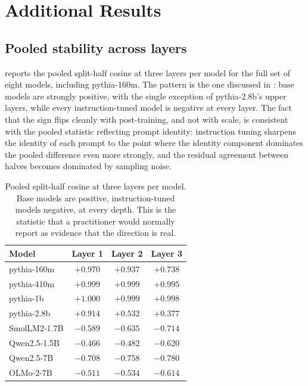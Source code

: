 \section{Additional Results}

\subsection{Pooled stability across layers}

 reports the pooled split-half cosine at three layers per model for the full
set of eight models, including pythia-160m. The pattern is the one discussed in
: base models are strongly positive, with the single exception of pythia-2.8b's
upper layers, while every instruction-tuned model is negative at every layer. The fact that the
sign flips cleanly with post-training, and not with scale, is consistent with the pooled statistic
reflecting prompt identity: instruction tuning sharpens the identity of each prompt to the point
where the identity component dominates the pooled difference even more strongly, and the residual
agreement between halves becomes dominated by sampling noise.

\begin{table}[t]
\centering
\small
\begin{tabular}{lccc}
\toprule
Model & Layer 1 & Layer 2 & Layer 3 \\
\midrule
pythia-160m          & $+0.970$ & $+0.937$ & $+0.738$ \\
pythia-410m          & $+0.999$ & $+0.999$ & $+0.995$ \\
pythia-1b            & $+1.000$ & $+0.999$ & $+0.998$ \\
pythia-2.8b          & $+0.914$ & $+0.532$ & $+0.377$ \\
SmolLM2-1.7B         & $-0.589$ & $-0.635$ & $-0.714$ \\
Qwen2.5-1.5B         & $-0.466$ & $-0.482$ & $-0.620$ \\
Qwen2.5-7B           & $-0.708$ & $-0.758$ & $-0.780$ \\
OLMo-2-7B            & $-0.511$ & $-0.534$ & $-0.614$ \\
\bottomrule
\end{tabular}
\caption{Pooled split-half cosine at three layers per model. Base models are positive, instruction-tuned
models negative, at every depth. This is the statistic that a practitioner would normally report as
evidence that the direction is real.}
\label{tab:pooled-layers}
\end{table}

